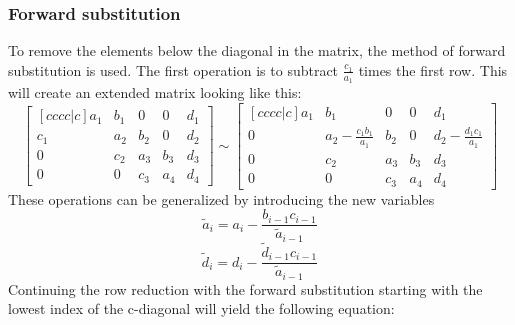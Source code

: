 \documentclass[12pt]{article}
\begin{document}
\subsubsection{Forward substitution}
To remove the elements below the diagonal in the matrix, the method of forward substitution is used. The first operation is to subtract $\frac{c_{1}}{a_{1}}$ times the first row. 
This will create an extended matrix looking like this: 
\begin{equation}
\begin{bmatrix}[cccc|c]
                           a_{1}&b_{1}&0&0& d_{1}\\
                           c_{1}&a_{2}&b_{2}&0& d_{2}\\
                           0&c_{2}&a_{3}&b_{3}& d_{3}\\
                           0&0&c_{3}&a_{4}& d_{4}
                      \end{bmatrix}
                      \sim
                      \begin{bmatrix}[cccc|c]
                           a_{1}&b_{1}&0&0& d_{1}\\
                           0&a_{2}-\frac{c_{1}b_{1}}{a_{1}}&b_{2}&0& d_{2}-\frac{d_{1}c_{1}}{a_{1}}\\
                           0&c_{2}&a_{3}&b_{3}& d_{3}\\
                           0&0&c_{3}&a_{4}& d_{4}
\end{bmatrix}
\end{equation}
These operations can be generalized by introducing the new variables
\begin{equation}
\tilde{a}_{i}=a_{i}-\frac{b_{i-1}c_{i-1}}{\tilde{a}_{i-1}}
\end{equation}
\begin{equation}
\tilde{d}_{i}=d_{i}-\frac{\tilde{d}_{i-1}c_{i-1}}{\tilde{a}_{i-1}}
\end{equation}
Continuing the row reduction with the forward substitution starting with the lowest index of the c-diagonal will yield the following equation:
\end{document}
